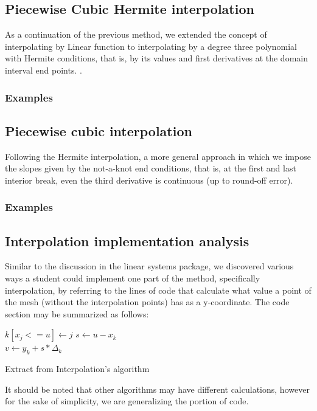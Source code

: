 \subsection{Piecewise Cubic Hermite interpolation}
As a continuation of the previous method, we extended the concept of interpolating by Linear function to interpolating by a degree three polynomial with Hermite conditions, that is, by its values and first derivatives at the domain interval end points. \cite{kreyszig11}.
\subsubsection{Examples}
	


\subsection{Piecewise cubic interpolation}
Following the Hermite interpolation, a more general approach in which we impose the slopes given by the not-a-knot end conditions, that is, at the first and last interior break, even the third derivative is continuous (up to round-off error). \cite{PCHIP}

\subsubsection{Examples}
	

\subsection{Interpolation implementation analysis}

Similar to the discussion in the linear systems package, we discovered various ways a student could implement one part of the method, specifically interpolation, by referring to the lines of code that calculate what value a point of the mesh (without the interpolation points) has as a y-coordinate. The code section may be summarized as follows: 



\begin{algorithm}[H]
\SetAlgoLined
{} {
$k[x_j <= u] \gets j$
}
$s \gets u - x_k$\\
$v \gets y_k + s * \Delta_k$

\caption{Extract from Interpolation's algorithm}
\end{algorithm}
It should be noted that other algorithms may have different calculations, however for the sake of simplicity, we are generalizing the portion of code.


